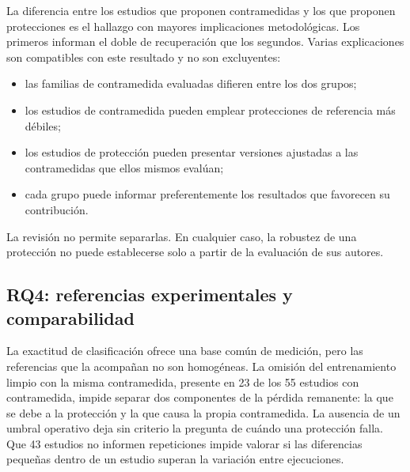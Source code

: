 La diferencia entre los estudios que proponen contramedidas y los que proponen protecciones es el hallazgo con mayores implicaciones metodológicas. Los primeros informan el doble de recuperación que los segundos. Varias explicaciones son compatibles con este resultado y no son excluyentes:
\begin{itemize}
\item las familias de contramedida evaluadas difieren entre los dos grupos;
\item los estudios de contramedida pueden emplear protecciones de referencia más débiles;
\item los estudios de protección pueden presentar versiones ajustadas a las contramedidas que ellos mismos evalúan;
\item cada grupo puede informar preferentemente los resultados que favorecen su contribución.
\end{itemize}
La revisión no permite separarlas. En cualquier caso, la robustez de una protección no puede establecerse solo a partir de la evaluación de sus autores.

\subsection{RQ4: referencias experimentales y comparabilidad}

La exactitud de clasificación ofrece una base común de medición, pero las referencias que la acompañan no son homogéneas. La omisión del entrenamiento limpio con la misma contramedida, presente en 23 de los 55 estudios con contramedida, impide separar dos componentes de la pérdida remanente: la que se debe a la protección y la que causa la propia contramedida. La ausencia de un umbral operativo deja sin criterio la pregunta de cuándo una protección falla. Que 43 estudios no informen repeticiones impide valorar si las diferencias pequeñas dentro de un estudio superan la variación entre ejecuciones.

